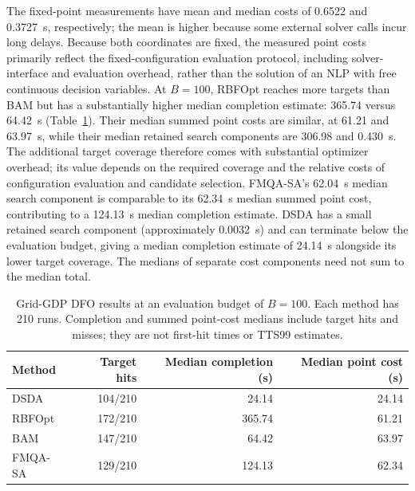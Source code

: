 \documentclass{article}
\begin{document}
The fixed-point measurements have mean and median costs of 0.6522 and 0.3727~s, respectively; the mean is higher because some external solver calls incur long delays.
Because both coordinates are fixed, the measured point costs primarily reflect the fixed-configuration evaluation protocol, including solver-interface and evaluation overhead, rather than the solution of an NLP with free continuous decision variables.
At $B=100$, RBFOpt reaches more targets than BAM but has a substantially higher median completion estimate: 365.74 versus 64.42~s (Table~\ref{tab:grid-cost}).
Their median summed point costs are similar, at 61.21 and 63.97~s, while their median retained search components are 306.98 and 0.430~s.
The additional target coverage therefore comes with substantial optimizer overhead; its value depends on the required coverage and the relative costs of configuration evaluation and candidate selection.
FMQA-SA's 62.04~s median search component is comparable to its 62.34~s median summed point cost, contributing to a 124.13~s median completion estimate.
DSDA has a small retained search component (approximately 0.0032~s) and can terminate below the evaluation budget, giving a median completion estimate of 24.14~s alongside its lower target coverage.
The medians of separate cost components need not sum to the median total.

\begin{table}[htbp]
\centering
\caption{Grid-GDP DFO results at an evaluation budget of $B=100$. Each method has 210 runs. Completion and summed point-cost medians include target hits and misses; they are not first-hit times or TTS99 estimates.}
\label{tab:grid-cost}
\begin{tabular}{lrrr}\toprule
Method & Target hits & Median completion (s) & Median point cost (s)\\\midrule
DSDA & 104/210 & 24.14 & 24.14\\
RBFOpt & 172/210 & 365.74 & 61.21\\
BAM & 147/210 & 64.42 & 63.97\\
FMQA-SA & 129/210 & 124.13 & 62.34\\
\bottomrule
\end{tabular}
\end{table}
\end{document}
